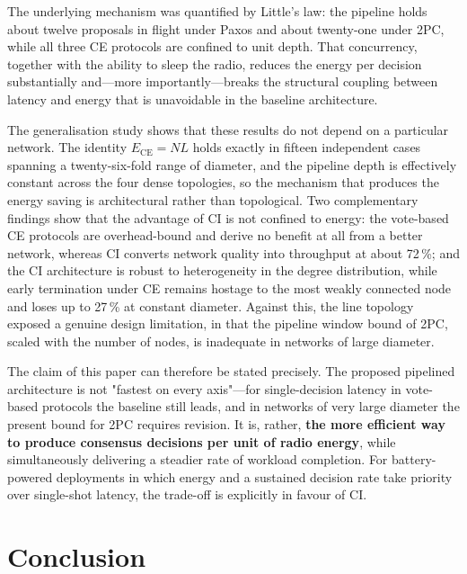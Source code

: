 \documentclass[journal]{IEEEtran}
\newcommand{\CI}{CI}                      %
\newcommand{\CE}{CE}                      %
\newcommand{\Nnodes}{N}                   %
\newcommand{\Ece}{E_{\mathrm{CE}}}        %
\begin{document}
The underlying mechanism was quantified by Little's law: the pipeline
holds about twelve proposals in flight under Paxos and about twenty-one under
2PC, while all three \CE{} protocols are confined to unit depth. That
concurrency, together with the ability to sleep the radio, reduces the
energy per decision substantially and---more importantly---breaks the
structural coupling between latency and energy that is unavoidable in the
baseline architecture.

The generalisation study shows that these results do not depend on a
particular network. The identity $\Ece = \Nnodes L$ holds exactly in fifteen
independent cases spanning a twenty-six-fold range of
diameter, and the pipeline depth is effectively constant across the four
dense topologies, so the mechanism that produces the energy saving is
architectural rather than topological. Two complementary findings show
that the advantage of \CI{} is not confined to energy: the vote-based
\CE{} protocols are overhead-bound and derive no benefit at all from a
better network, whereas \CI{} converts network quality into throughput at
about 72\,\%; and the \CI{} architecture is robust to heterogeneity in the
degree distribution, while early termination under \CE{} remains hostage
to the most weakly connected node and loses up to 27\,\% at constant
diameter. Against this, the line topology exposed a genuine design
limitation, in that the pipeline window bound of 2PC, scaled with the
number of nodes, is inadequate in networks of large diameter.

The claim of this paper can therefore be stated precisely. The proposed
pipelined architecture is not "fastest on every axis"---for single-decision
latency in vote-based protocols the baseline still leads, and in networks
of very large diameter the present bound for 2PC requires revision. It is,
rather, \textbf{the more efficient way to produce consensus decisions per
unit of radio energy}, while simultaneously delivering a steadier rate of
workload completion. For battery-powered deployments in which energy and a
sustained decision rate take priority over single-shot latency, the
trade-off is explicitly in favour of \CI.

\section{Conclusion}
\label{sec:conclusion}
\end{document}
